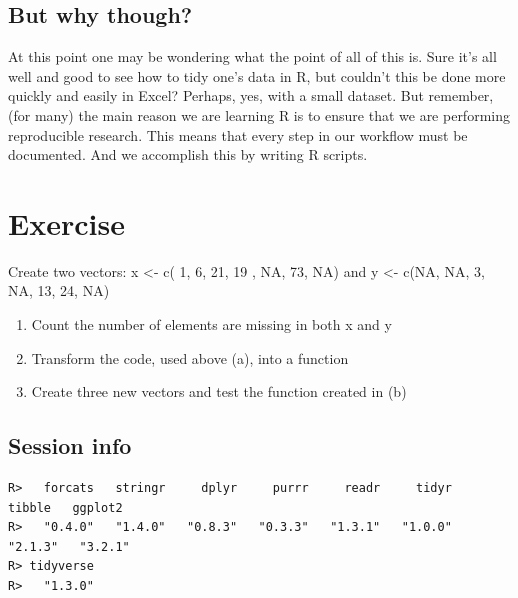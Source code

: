 \documentclass[
]{book}
\newenvironment{Shaded}{\begin{snugshade}}{\end{snugshade}}
\newcommand{\KeywordTok}[1]{\textcolor[rgb]{0.13,0.29,0.53}{\textbf{#1}}}
\newcommand{\NormalTok}[1]{#1}
\newcommand{\OperatorTok}[1]{\textcolor[rgb]{0.81,0.36,0.00}{\textbf{#1}}}
\newcommand{\StringTok}[1]{\textcolor[rgb]{0.31,0.60,0.02}{#1}}
\begin{document}
\hypertarget{but-why-though}{%
\section{But why though?}\label{but-why-though}}

At this point one may be wondering what the point of all of this is. Sure it's all well and good to see how to tidy one's data in R, but couldn't this be done more quickly and easily in Excel? Perhaps, yes, with a small dataset. But remember, (for many) the main reason we are learning R is to ensure that we are performing reproducible research. This means that every step in our workflow must be documented. And we accomplish this by writing R scripts.

\hypertarget{exercise-4}{%
\chapter{Exercise}\label{exercise-4}}

Create two vectors: x \textless- c( 1, 6, 21, 19 , NA, 73, NA) and y \textless- c(NA, NA, 3, NA, 13, 24, NA)

\begin{enumerate}
\def\labelenumi{\alph{enumi})}
\item
  Count the number of elements are missing in both x and y
\item
  Transform the code, used above (a), into a function
\item
  Create three new vectors and test the function created in (b)
\end{enumerate}

\hypertarget{session-info-9}{%
\section{Session info}\label{session-info-9}}

\begin{Shaded}
\end{Shaded}

\begin{verbatim}
R>   forcats   stringr     dplyr     purrr     readr     tidyr    tibble   ggplot2 
R>   "0.4.0"   "1.4.0"   "0.8.3"   "0.3.3"   "1.3.1"   "1.0.0"   "2.1.3"   "3.2.1" 
R> tidyverse 
R>   "1.3.0"
\end{verbatim}
\end{document}
